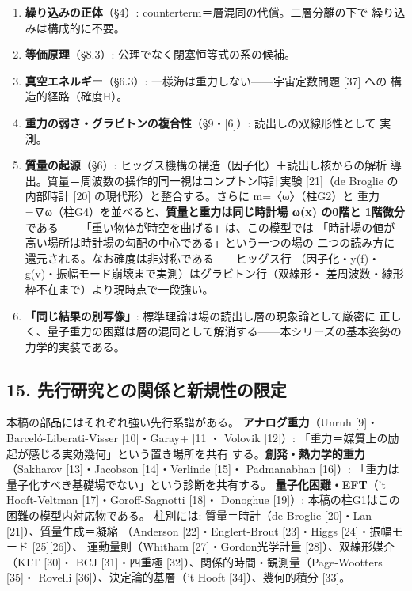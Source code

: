 \documentclass[
]{ltjarticle}
\providecommand{\tightlist}{%
  \setlength{\itemsep}{0pt}\setlength{\parskip}{0pt}}
\begin{document}
\begin{enumerate}
\def\labelenumi{\arabic{enumi}.}
\tightlist
\item
  \textbf{繰り込みの正体}（§4）:
  counterterm＝層混同の代償。二層分離の下で 繰り込みは構成的に不要。
\item
  \textbf{等価原理}（§8.3）: 公理でなく閉塞恒等式の系の候補。
\item
  \textbf{真空エネルギー}（§6.3）: 一様海は重力しない------宇宙定数問題
  {[}37{]} への 構造的経路（確度H）。
\item
  \textbf{重力の弱さ・グラビトンの複合性}（§9・{[}6{]}）:
  読出しの双線形性として 実測。
\item
  \textbf{質量の起源}（§6）:
  ヒッグス機構の構造（因子化）＋読出し核からの解析
  導出。質量＝周波数の操作的同一視はコンプトン時計実験 {[}21{]}（de
  Broglie の 内部時計 {[}20{]} の現代形）と整合する。さらに
  m=〈ω〉（柱G2）と
  重力=∇ω（柱G4）を並べると、\textbf{質量と重力は同じ時計場 ω(x) の0階と
  1階微分}である------「重い物体が時空を曲げる」は、この模型では
  「時計場の値が高い場所は時計場の勾配の中心である」という一つの場の
  二つの読み方に還元される。なお確度は非対称である------ヒッグス行
  （因子化・y(f)・g(v)・振幅モード崩壊まで実測）はグラビトン行（双線形・
  差周波数・線形枠不在まで）より現時点で一段強い。
\item
  \textbf{「同じ結果の別写像」}:
  標準理論は場の読出し層の現象論として厳密に
  正しく、量子重力の困難は層の混同として解消する------本シリーズの基本姿勢の
  力学的実装である。
\end{enumerate}

\subsection{15.
先行研究との関係と新規性の限定}\label{ux5148ux884cux7814ux7a76ux3068ux306eux95a2ux4fc2ux3068ux65b0ux898fux6027ux306eux9650ux5b9a}

本稿の部品にはそれぞれ強い先行系譜がある。 \textbf{アナログ重力}（Unruh
{[}9{]}・Barceló-Liberati-Visser {[}10{]}・Garay+ {[}11{]}・ Volovik
{[}12{]}）: 「重力＝媒質上の励起が感じる実効幾何」という置き場所を共有
する。\textbf{創発・熱力学的重力}（Sakharov {[}13{]}・Jacobson
{[}14{]}・Verlinde {[}15{]}・ Padmanabhan {[}16{]}）:
「重力は量子化すべき基礎場でない」という診断を共有する。
\textbf{量子化困難・EFT}（'t Hooft-Veltman {[}17{]}・Goroff-Sagnotti
{[}18{]}・ Donoghue {[}19{]}）:
本稿の柱G1はこの困難の模型内対応物である。 柱別には: 質量＝時計（de
Broglie {[}20{]}・Lan+ {[}21{]}）、質量生成＝凝縮 （Anderson
{[}22{]}・Englert-Brout {[}23{]}・Higgs {[}24{]}・振幅モード
{[}25{]}{[}26{]}）、 運動量則（Whitham {[}27{]}・Gordon光学計量
{[}28{]}）、双線形媒介（KLT {[}30{]}・ BCJ {[}31{]}・四重極
{[}32{]}）、関係的時間・観測量（Page-Wootters {[}35{]}・ Rovelli
{[}36{]}）、決定論的基層（'t Hooft {[}34{]}）、幾何的積分 {[}33{]}。
\end{document}
